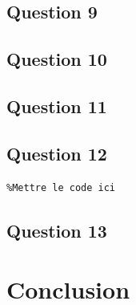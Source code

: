 \documentclass[a4paper,11pt]{article}
\begin{document}
\subsection{Question 9}

\subsection{Question 10}

\subsection{Question 11}

\subsection{Question 12}
\begin{verbatim}
%Mettre le code ici
\end{verbatim}

\subsection{Question 13}

\section{Conclusion}
\end{document}
